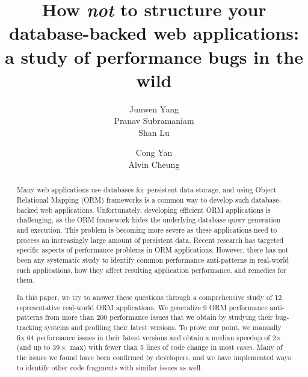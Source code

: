 \documentclass[sigconf]{acmart}
\newcommand{\maxspeedup}{39\xspace}
\begin{document}
\title{How {\em not} to structure your database-backed web applications:\\
a study of performance bugs in the wild 
}

\author{Junwen Yang\\Pranav Subramaniam\\Shan Lu}
\author{Cong Yan\\Alvin Cheung}




\begin{abstract}
Many web applications use databases for persistent data storage, and using Object Relational Mapping (ORM) frameworks is a common way to develop such database-backed web applications.
Unfortunately, developing efficient ORM applications is challenging, as the ORM framework hides the underlying database query generation and execution. This problem is becoming more severe as these applications need to process an increasingly large amount of persistent data. 
Recent research has targeted specific aspects of performance problems in ORM applications. However, 
there has not been any systematic study to identify common performance anti-patterns in real-world
such applications, how they affect resulting application performance, and remedies for them.

In this paper, we try to answer these questions through a comprehensive study of 12 representative real-world ORM applications. We generalize 9 ORM performance anti-patterns from more than 200 performance issues that we obtain by studying their bug-tracking systems and
profiling their latest versions. To prove our point, we manually fix 64 performance issues in their latest versions and obtain a median speedup of 2$\times$ (and up to $\maxspeedup\times$ max) with fewer than 5 lines of code change in most cases. 
Many of the issues we found have been confirmed by developers, and we have implemented ways to identify other code fragments with similar issues as well.
\end{abstract}
\end{document}
